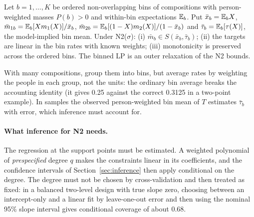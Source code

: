 \begin{lemma}\label{lem:bins}
Let $b=1,\dots,K$ be ordered non-overlapping bins of compositions with
person-weighted masses $P(b)>0$ and within-bin expectations $\mathbb E_b$. Put
$\bar x_b=\mathbb E_bX$, $\bar m_{1b}=\mathbb E_b[Xm_1(X)]/\bar x_b$,
$\bar m_{2b}=\mathbb E_b[(1-X)m_2(X)]/(1-\bar x_b)$ and $\bar\tau_b=\mathbb E_b[\tau(X)]$, the
model-implied bin mean. Under N2($\sigma$): (i) $\bar m_b\in S(\bar x_b,\bar\tau_b)$;
(ii) the targets are linear in the bin rates with known weights; (iii) monotonicity
is preserved across the ordered bins. The binned LP is an outer relaxation of the
N2 bounds.
\end{lemma}
\begin{reading}
With many compositions, group them into bins, but average rates by weighting the
people in each group, not the units: the ordinary bin average breaks the
accounting identity (it gives 0.25 against the correct 0.3125 in a two-point
example). In samples the observed person-weighted bin mean of $T$ estimates
$\bar\tau_b$ with error, which inference must account for.
\end{reading}

\paragraph{What inference for N2 needs.} The regression at the support points
must be estimated. A weighted polynomial of \emph{prespecified} degree $q$ makes
the constraints linear in its coefficients, and the confidence intervals of
Section~\ref{sec:inference} then apply conditional on the degree. The degree must
not be chosen by cross-validation and then treated as fixed: in a balanced
two-level design with true slope zero, choosing between an intercept-only and a
linear fit by leave-one-out error and then using the nominal 95\% slope interval
gives conditional coverage of about 0.68.
